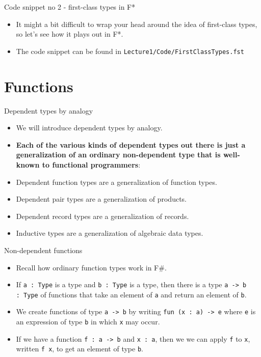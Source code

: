\documentclass{beamer}
\newcommand{\m}[1]{\texttt{#1}}
\begin{document}
\begin{frame}{Code snippet no 2 - first-class types in F*}
\begin{itemize}
	\item It might a bit difficult to wrap your head around the idea of first-class types, so let's see how it plays out in F*.
	\item The code snippet can be found in \m{Lecture1/Code/FirstClassTypes.fst}
\end{itemize}
\end{frame}

\section{Functions}

\begin{frame}{Dependent types by analogy}
\begin{itemize}
	\item We will introduce dependent types by analogy.
	\item \textbf{Each of the various kinds of dependent types out there is just a generalization of an ordinary non-dependent type that is well-known to functional programmers}:
	\item Dependent function types are a generalization of function types.
	\item Dependent pair types are a generalization of products.
	\item Dependent record types are a generalization of records.
	\item Inductive types are a generalization of algebraic data types.
\end{itemize}
\end{frame}

\begin{frame}{Non-dependent functions}
\begin{itemize}
	\item Recall how ordinary function types work in F\#.
	\item If \m{a :\ Type} is a type and \m{b :\ Type} is a type, then there is a type \m{a -> b :\ Type} of functions that take an element of \m{a} and return an element of \m{b}.
	\item We create functions of type \m{a -> b} by writing \m{fun (x :\ a) -> e} where \m{e} is an expression of type \m{b} in which \m{x} may occur.
	\item If we have a function \m{f :\ a -> b} and \m{x :\ a}, then we we can apply \m{f} to \m{x}, written \m{f x}, to get an element of type \m{b}.
\end{itemize}
\end{frame}
\end{document}
